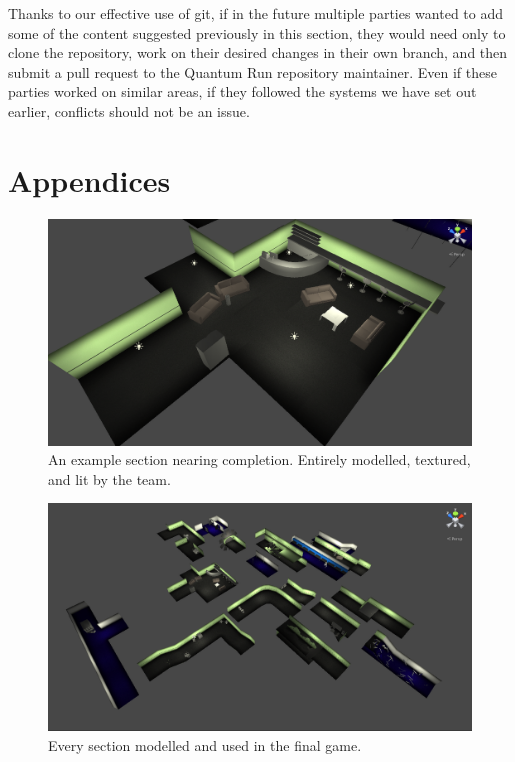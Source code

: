 \documentclass[a4paper,oneside]{memoir}
\begin{document}
			Thanks to our effective use of git, if in the future multiple parties wanted to add some of the content suggested previously in this section, they would need only to clone the repository, work on their desired changes in their own branch, and then submit a pull request to the Quantum Run repository maintainer.
			Even if these parties worked on similar areas, if they followed the systems we have set out earlier, conflicts should not be an issue.



{}


\chapter{Appendices}
	\begin{figure}[ht]
		\begin{center}
			\includegraphics[width=150mm]{../Screenshots/Appendices/cafe.png}
			\caption{An example section nearing completion. Entirely modelled, textured, and lit by the team.}
		\end{center}
	\end{figure}

	\begin{figure}[ht]
		\begin{center}
			\includegraphics[width=150mm]{../Screenshots/Appendices/all-sections.png}
			\caption{Every section modelled and used in the final game.}
		\end{center}
	\end{figure}
\end{document}
